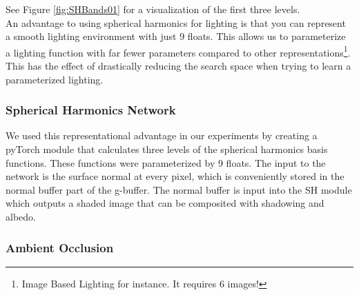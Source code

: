 \documentclass[10pt,twocolumn,letterpaper]{article}
\begin{document}
See Figure \ref{fig:SHBands01} for a visualization of the first three levels.\\%

An advantage to using spherical harmonics for lighting is that you can represent a smooth lighting environment with just 9 floats.  This allows us to parameterize a lighting function with far fewer parameters compared to other representations\footnote{Image Based Lighting for instance.  It requires 6 images!}. This has the effect of drastically reducing the search space when trying to learn a parameterized lighting.

\subsubsection{Spherical Harmonics Network}

We used this representational advantage in our experiments by creating a pyTorch \cite{PYTORCH} module that calculates three levels of the spherical harmonics basis functions.  These functions were parameterized by 9 floats.  The input to the network is the surface normal at every pixel, which is conveniently stored in the normal buffer part of the g-buffer. The normal buffer is input into the SH module which outputs a shaded image that can be composited with shadowing and albedo.

\subsubsection{Ambient Occlusion}
\end{document}
